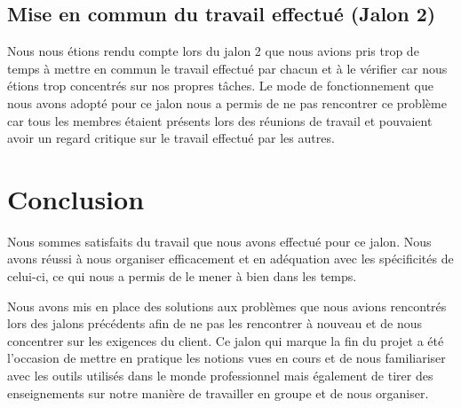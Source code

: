 \documentclass{report}
\begin{document}
\section{Mise en commun du travail effectué (Jalon 2)}
Nous nous étions rendu compte lors du jalon 2 que nous avions pris trop de temps à mettre
en commun le travail effectué par chacun et à le vérifier car nous étions trop concentrés sur
nos propres tâches. Le mode de fonctionnement que nous avons adopté pour ce jalon nous
a permis de ne pas rencontrer ce problème car tous les membres étaient présents lors des réunions de
travail et pouvaient avoir un regard critique sur le travail effectué par les autres.

\chapter{Conclusion}
Nous sommes satisfaits du travail que nous avons effectué pour ce jalon. Nous avons réussi
à nous organiser efficacement et en adéquation avec les spécificités de celui-ci, ce qui nous a
permis de le mener à bien dans les temps.

Nous avons mis en place des solutions aux problèmes que nous avions rencontrés lors
des jalons précédents afin de ne pas les rencontrer à nouveau et de nous
concentrer sur les exigences du client. Ce jalon qui marque la fin du projet a été l'occasion
de mettre en pratique les notions vues en cours et de nous familiariser avec les outils utilisés
dans le monde professionnel mais également de tirer des enseignements sur notre manière
de travailler en groupe et de nous organiser.
\end{document}
